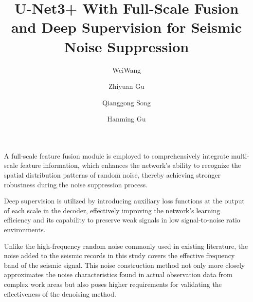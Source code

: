 \documentclass[preprint,12pt]{elsarticle}
\begin{document}
\begin{frontmatter}

\title{U-Net3+ With Full-Scale Fusion and Deep Supervision for Seismic Noise Suppression}

\author[label1]{WeiWang} %
\author[label2]{Zhiyuan Gu} %
\author[label3]{Qianggong Song} %
\author[label1]{Hanming Gu} %

            

\begin{highlights}
    \item A full-scale feature fusion module is employed to comprehensively integrate multi-scale feature information, which enhances the network's ability to recognize the spatial distribution patterns of random noise, thereby achieving stronger robustness during the noise suppression process.
    \item Deep supervision is utilized by introducing auxiliary loss functions at the output of each scale in the decoder, effectively improving the network's learning efficiency and its capability to preserve weak signals in low signal-to-noise ratio environments.
    \item Unlike the high-frequency random noise commonly used in existing literature, the noise added to the seismic records in this study covers the effective frequency band of the seismic signal. This noise construction method not only more closely approximates the noise characteristics found in actual observation data from complex work areas but also poses higher requirements for validating the effectiveness of the denoising method.
\end{highlights}


\end{frontmatter}
\end{document}
